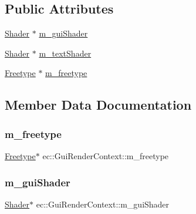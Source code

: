 \subsection*{Public Attributes}
\begin{DoxyCompactItemize}
\item 
\mbox{\hyperlink{classec_1_1_shader}{Shader}} $\ast$ \mbox{\hyperlink{structec_1_1_gui_render_context_a3e84bcc858adbf27c4b8503d5f960047}{m\+\_\+gui\+Shader}}
\item 
\mbox{\hyperlink{classec_1_1_shader}{Shader}} $\ast$ \mbox{\hyperlink{structec_1_1_gui_render_context_aa42aa86b9e3f12b973329494a3c89f90}{m\+\_\+text\+Shader}}
\item 
\mbox{\hyperlink{classec_1_1_freetype}{Freetype}} $\ast$ \mbox{\hyperlink{structec_1_1_gui_render_context_aca121abf7990be17623ef5e34519b768}{m\+\_\+freetype}}
\end{DoxyCompactItemize}


\subsection{Member Data Documentation}
\mbox{\label{structec_1_1_gui_render_context_aca121abf7990be17623ef5e34519b768}} 
\subsubsection{\texorpdfstring{m\+\_\+freetype}{m\_freetype}}
{\footnotesize\ttfamily \mbox{\hyperlink{classec_1_1_freetype}{Freetype}}$\ast$ ec\+::\+Gui\+Render\+Context\+::m\+\_\+freetype}

\mbox{\label{structec_1_1_gui_render_context_a3e84bcc858adbf27c4b8503d5f960047}} 
\subsubsection{\texorpdfstring{m\+\_\+gui\+Shader}{m\_guiShader}}
{\footnotesize\ttfamily \mbox{\hyperlink{classec_1_1_shader}{Shader}}$\ast$ ec\+::\+Gui\+Render\+Context\+::m\+\_\+gui\+Shader}

